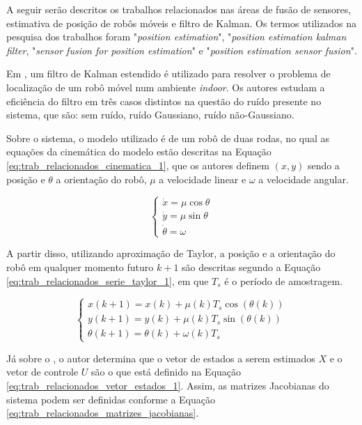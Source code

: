 \documentclass[acronym, symbols, table]{fei}
\begin{document}
A seguir serão descritos os trabalhos relacionados nas áreas de fusão de sensores, estimativa de posição de robôs móveis e filtro de Kalman. Os termos utilizados na pesquisa dos trabalhos foram "\textit{position estimation}", "\textit{position estimation kalman filter}, "\textit{sensor fusion for position estimation}" e "\textit{position estimation sensor fusion}".

Em \textcite{eman2020mobile}, um filtro de Kalman estendido é utilizado para resolver o problema de localização de um robô móvel num ambiente \textit{indoor}. Os autores estudam a eficiência do filtro em três casos distintos na questão do ruído presente no sistema, que são: sem ruído, ruído Gaussiano, ruído não-Gaussiano.

Sobre o sistema, o modelo utilizado é de um robô de duas rodas, no qual as equações da cinemática do modelo estão descritas na Equação \eqref{eq:trab_relacionados_cinematica_1}, que os autores definem $(x, y)$ sendo a posição e $\theta$ a orientação do robô, $\mu$ a velocidade linear e $\omega$ a velocidade angular.

\begin{equation}\label{eq:trab_relacionados_cinematica_1}
	\begin{cases}
		\dot{x} = \mu \cos{\theta} \\
		\dot{y} = \mu \sin{\theta} \\
		\dot{\theta} = \omega
	\end{cases}
\end{equation}

A partir disso, utilizando aproximação de Taylor, a posição e a orientação do robô em qualquer momento futuro $k + 1$ são descritas segundo a Equação \eqref{eq:trab_relacionados_serie_taylor_1}, em que $T_s$ é o período de amostragem.

\begin{equation} \label{eq:trab_relacionados_serie_taylor_1}
	\begin{cases*}
		x(k+1) = x(k) + \mu(k)T_s\cos{(\theta(k))} \\
		y(k+1) = y(k) + \mu(k)T_s\sin{(\theta(k))} \\
		\theta(k+1) = \theta(k) + \omega(k)T_s
	\end{cases*}
\end{equation}

Já sobre o , o autor determina que o vetor de estados a serem estimados $X$ e o vetor de controle $U$ são o que está definido na Equação \eqref{eq:trab_relacionados_vetor_estados_1}. Assim, as matrizes Jacobianas do sistema podem ser definidas conforme a Equação \eqref{eq:trab_relacionados_matrizes_jacobianas}.
\end{document}
